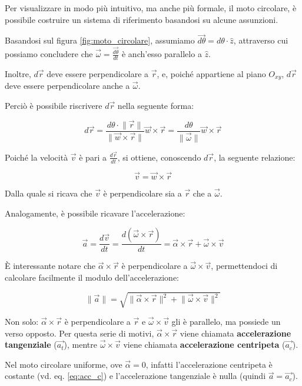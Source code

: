 \documentclass[oneside]{book}
\newcommand{\norm}[1]{\lVert \vec{#1} \rVert}
\newcommand{\nnorm}[1]{\lVert #1 \rVert}
\begin{document}
Per visualizzare in modo più intuitivo, ma anche più formale, il
moto circolare, è possibile costruire un sistema di riferimento
basandosi su alcune assunzioni.

Basandosi sul figura \ref{fig:moto_circolare}, assumiamo
$\vec{d\theta} = d\theta \cdot \hat{z}$, attraverso cui
possiamo concludere che $\vec{\omega}=\frac{\vec{d\theta}}{dt}$ è anch'esso
parallelo a $\hat{z}$.

Inoltre, $d\vec{r}$ deve essere perpendicolare a $\vec{r}$, e, poiché
appartiene al piano $O_{xy}$, $d\vec{r}$ deve essere perpendicolare anche
a $\vec{\omega}$.

Perciò è possibile riscrivere $d\vec{r}$ nella seguente forma:

\begin{equation*}
    d\vec{r}=\frac{d\theta \cdot \norm{r}}{\lVert \vec{w} \times
    \vec{r} \rVert} \vec{w} \times \vec{r} =
    \frac{d\theta}{\norm{\omega}} \vec{w} \times \vec{r}
\end{equation*}

Poiché la velocità $\vec{v}$ è pari a $\frac{d\vec{r}}{dt}$, si ottiene,
conoscendo $d\vec{r}$, la seguente relazione:

\begin{equation}
    \vec{v}=\vec{w}\times\vec{r}
\end{equation}

Dalla quale si ricava che $\vec{v}$ è perpendicolare sia a $\vec{r}$ che
a $\vec{\omega}$.

Analogamente, è possibile ricavare l'accelerazione:

\begin{equation}
    \vec{a}=\frac{d\vec{v}}{dt}=\frac{d(\vec{\omega}
    \times \vec{r})}{dt}=\vec{\alpha} \times \vec{r}
    + \vec{\omega} \times \vec{v}
\end{equation}

È interessante notare che $\vec{\alpha} \times \vec{r}$
è perpendicolare a $\vec{\omega} \times \vec{v}$, permettendoci
di calcolare facilmente il modulo dell'accelerazione:

\begin{equation}
    \norm{a} = \sqrt{\nnorm{\vec{\alpha} \times \vec{r}}^2 + \nnorm{\vec{\omega} \times \vec{v}}^2}
\end{equation}

Non solo: $\vec{\alpha} \times \vec{r}$ è perpendicolare a $\vec{r}$ e
$\vec{\omega} \times \vec{v}$ gli è parallelo, ma possiede un verso opposto.
Per questa serie di motivi, $\vec{\alpha} \times \vec{r}$ viene chiamata
\textbf{accelerazione tangenziale} ($\vec{a_t}$), mentre
$\vec{\omega} \times \vec{v}$ viene chiamata \textbf{accelerazione centripeta}
($\vec{a_c}$).

Nel moto circolare uniforme, ove $\vec{\alpha}=0$, infatti l'accelerazione
centripeta è costante (vd. eq. \ref{eq:acc_c}) e l'accelerazione tangenziale
è nulla (quindi $\vec{a}=\vec{a_c}$).
\end{document}
